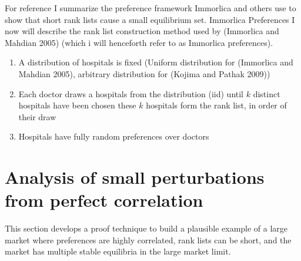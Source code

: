 \documentclass[WP]{AEA}
\begin{document}

For reference I summarize the preference framework Immorlica and others use to show that short rank lists cause a small equilibrium set.
Immorlica Preferences
I now will describe the rank list construction method used by (Immorlica and Mahdian 2005) (which i will henceforth refer to as Immorlica preferences).

\begin{enumerate}
	\item A distribution of hospitals is fixed (Uniform distribution for (Immorlica and Mahdian 2005), arbitrary distribution for (Kojima and Pathak 2009))
	\item Each doctor draws a hospitals from the distribution (iid) until $k$ distinct hospitals have been chosen these $k$ hospitals form the rank list, in order of their draw
	\item Hospitals have fully random preferences over doctors
\end{enumerate}





\section{Analysis of small perturbations from perfect correlation}  \label{sect:counterexample}
This section develops a proof technique to build a plausible example of a large market where preferences are highly correlated, rank lists can be short, and the market has multiple stable equilibria in the large market limit. 
\end{document}
